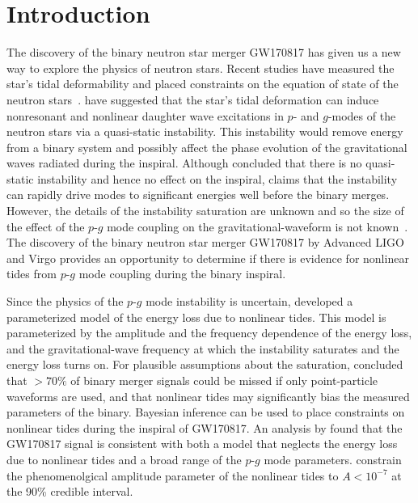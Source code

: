\section{Introduction} \label{sec:intro}
The discovery of the binary neutron star merger GW170817
\citep{TheLIGOScientific:2017qsa} has given us a new way to explore the
physics of neutron stars. Recent studies have measured the star's tidal
deformability and placed constraints on the equation of state of the neutron
stars~\citep{TheLIGOScientific:2017qsa,Tews:2018iwm,Most:2018eaw,Raithel:2018ncd,de2018tidal,Abbott:2018exr,Abbott:2018wiz}.
\cite{Weinberg:2013pbi} have suggested that the star's tidal deformation can
induce nonresonant and nonlinear daughter wave excitations in $p$- and
$g$-modes of the neutron stars via a quasi-static instability. This
instability would remove energy from a binary system and possibly affect the
phase evolution of the gravitational waves radiated during the inspiral.
Although \cite{Venumadhav:2013nla} concluded that there is no quasi-static
instability and hence no effect on the inspiral, \cite{Weinberg:2015pxa}
claims that the instability can rapidly drive modes to significant energies
well before the binary merges. However, the details of the instability
saturation are unknown and so the size of the effect of the $p$-$g$ mode
coupling on the gravitational-waveform is not known~\citep{Weinberg:2015pxa}.
The discovery of the binary neutron star merger GW170817 by Advanced LIGO and
Virgo provides an opportunity to determine if there is evidence for nonlinear
tides from $p$-$g$ mode coupling during the binary inspiral. 

Since the physics of the $p$-$g$ mode instability is uncertain,
\cite{Essick:2016tkn} developed a parameterized model of the energy loss due
to nonlinear tides. This model is parameterized by the amplitude and the
frequency dependence of the energy loss, and the gravitational-wave frequency
at which the instability saturates and the energy loss turns on. For plausible
assumptions about the saturation, \cite{Essick:2016tkn} concluded that $>
70\%$ of binary merger signals could be missed if only point-particle
waveforms are used, and that nonlinear tides may significantly bias the
measured parameters of the binary. Bayesian inference can be used to place
constraints on nonlinear tides during the inspiral of GW170817. An analysis by
\cite{abbott2019constraining} found that the GW170817 signal is consistent with both
a model that neglects the energy loss due to nonlinear tides and a broad range
of the $p$-$g$ mode parameters.  \cite{abbott2019constraining} constrain the
phenomenolgical amplitude parameter of the  nonlinear tides to $A < 10^{-7}$
at the 90\% credible interval. 

